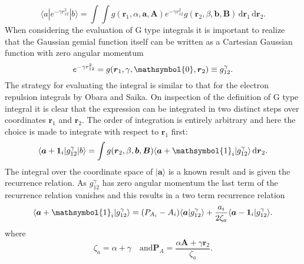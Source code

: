 \[
	\langle a | e^{-\gamma r_{12}^2} | b \rangle =\int \int g(\boldsymbol{r}_1,\alpha,\boldsymbol{a},\boldsymbol{A}) e^{-\gamma r_{12}^2} g(\boldsymbol{r}_2,\beta,\boldsymbol{b},\boldsymbol{B}) \, \mathrm{d}\boldsymbol{r}_1  \, \mathrm{d}\boldsymbol{r}_2 
.\] 
When considering the evaluation of G type integrals it is important to realize that the Gaussian gemial function itself can be written as a Cartesian Gaussian function with zero angular momentum
\[
	e^{-\gamma r_{12}^2} = g(\boldsymbol{r}_1, \gamma, \mathsymbol{0}, \boldsymbol{r}_2) \equiv g_{12}^\gamma
.\] 
The strategy for evaluating the integral is similar to that for the electron repulsion integrals by Obara and Saika. On inspection of the definition of G type integral it is clear that the expression can be integrated in two distinct steps over coordinates $\boldsymbol{r}_1$ and $\boldsymbol{r}_2$. The order of integration is entirely arbitrary and here the choice is made to integrate with respect to $\boldsymbol{r}_1$ first:
\[
	\langle \boldsymbol{a} + \boldsymbol{1}_i | g_{12}^{\gamma}  | b  \rangle = \int g(\boldsymbol{r}_2,\beta, \boldsymbol{b},\boldsymbol{B}) \langle \boldsymbol{a} + \mathsymbol{1}_i | g_{12} ^\gamma  \rangle \, \mathrm{d}\boldsymbol{r}_2 
.\] 
The integral over the coordinate space of $| \boldsymbol{a} \rangle $ is a known result and is given the recurrence relation. As $g_{12}^\gamma$ has zero angular momentum the last term of the recurrence relation vanishes and this results in a two term recurrence relation
\[
	\langle \boldsymbol{a} + \mathsymbol{1}_i | g_{12}^\gamma \rangle = (P_{A_i} - A_i) \langle \boldsymbol{a} | g_{12}^\gamma \rangle + \frac{a_i}{2 \zeta_a} \langle \boldsymbol{a} - \boldsymbol{1}_i | g_{12}^\gamma \rangle 
.\] 
where
\[
	\zeta_a = \alpha + \gamma \quad \text{and} \boldsymbol{P}_A = \frac{\alpha \boldsymbol{A} + \gamma \boldsymbol{r}_2}{\zeta_a}
.\] 

